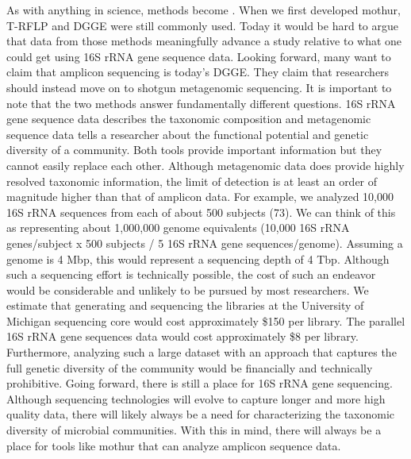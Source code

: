\documentclass[11pt,]{article}
\begin{document}
As with anything in science, methods become . When we
first developed mothur, T-RFLP and DGGE were still commonly used. Today
it would be hard to argue that data from those methods meaningfully
advance a study relative to what one could get using 16S rRNA gene
sequence data. Looking forward, many want to claim that amplicon
sequencing is today's DGGE. They claim that researchers should instead
move on to shotgun metagenomic sequencing. It is important to note that
the two methods answer fundamentally different questions. 16S rRNA gene
sequence data describes the taxonomic composition and metagenomic
sequence data tells a researcher about the functional potential and
genetic diversity of a community. Both tools provide important
information but they cannot easily replace each other. Although
metagenomic data does provide highly resolved taxonomic information, the
limit of detection is at least an order of magnitude higher than that of
amplicon data. For example, we analyzed 10,000 16S rRNA sequences from
each of about 500 subjects (73). We can think of this as representing
about 1,000,000 genome equivalents (10,000 16S rRNA genes/subject x 500
subjects / 5 16S rRNA gene sequences/genome). Assuming a genome is 4
Mbp, this would represent a sequencing depth of 4 Tbp. Although such a
sequencing effort is technically possible, the cost of such an endeavor
would be considerable and unlikely to be pursued by most researchers. We
estimate that generating and sequencing the libraries at the University
of Michigan sequencing core would cost approximately \$150 per library.
The parallel 16S rRNA gene sequences data would cost approximately \$8
per library. Furthermore, analyzing such a large dataset with an
approach that captures the full genetic diversity of the community would
be financially and technically prohibitive. Going forward, there is
still a place for 16S rRNA gene sequencing. Although sequencing
technologies will evolve to capture longer and more high quality data,
there will likely always be a need for characterizing the taxonomic
diversity of microbial communities. With this in mind, there will always
be a place for tools like mothur that can analyze amplicon sequence
data.
\end{document}
